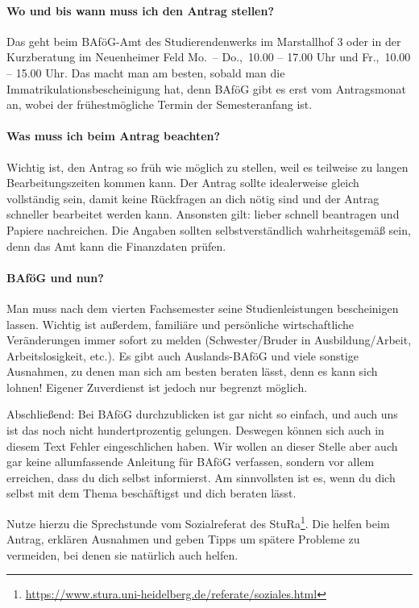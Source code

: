 \paragraph{Wo und bis wann muss ich den Antrag stellen?}
Das geht beim BAföG-Amt des Studierendenwerks im Marstallhof 3 oder in der Kurzberatung im Neuenheimer Feld Mo.\ -- Do.,\ 10.00 -- 17.00 Uhr und Fr.,\ 10.00 -- 15.00 Uhr. Das macht man am besten, sobald man die Immatrikulationsbescheinigung hat, denn BAföG gibt es erst vom Antragsmonat an, wobei der frühestmögliche Termin der Semesteranfang ist.

\paragraph{Was muss ich beim Antrag beachten?}
Wichtig ist, den Antrag so früh wie möglich zu stellen, weil es teilweise zu langen Bearbeitungszeiten kommen kann. Der Antrag sollte idealerweise gleich vollständig sein, damit keine Rückfragen an dich nötig sind und der Antrag schneller bearbeitet werden kann. Ansonsten gilt: lieber schnell beantragen und Papiere nachreichen. Die Angaben sollten selbstverständlich wahrheitsgemäß sein, denn das Amt kann die Finanzdaten prüfen.

\paragraph{BAföG und nun?}
Man muss nach dem vierten Fachsemester seine Studienleistungen bescheinigen lassen. Wichtig ist außerdem,  familiäre und persönliche wirtschaftliche Veränderungen immer sofort zu melden (Schwester/Bruder in Ausbildung/Arbeit, Arbeitslosigkeit, etc.). Es gibt auch Auslands-BAföG und viele sonstige Ausnahmen, zu denen man sich am besten beraten lässt, denn es kann sich lohnen! Eigener Zuverdienst ist jedoch nur begrenzt möglich.

\noindent Abschließend: Bei BAföG durchzublicken ist gar nicht so einfach, und auch uns ist das noch nicht hundertprozentig gelungen. Deswegen können sich auch in diesem Text Fehler eingeschlichen haben. Wir wollen an dieser Stelle aber auch gar keine allumfassende Anleitung für BAföG verfassen, sondern vor allem erreichen, dass du dich selbst informierst. Am sinnvollsten ist es, wenn du dich selbst mit dem Thema beschäftigst und dich beraten lässt.

Nutze hierzu die Sprechstunde vom Sozialreferat des \gls{StuRa}\footnote{\url{https://www.stura.uni-heidelberg.de/referate/soziales.html}}. Die helfen beim Antrag, erklären Ausnahmen und geben Tipps um spätere Probleme zu vermeiden, bei denen sie natürlich auch helfen.
